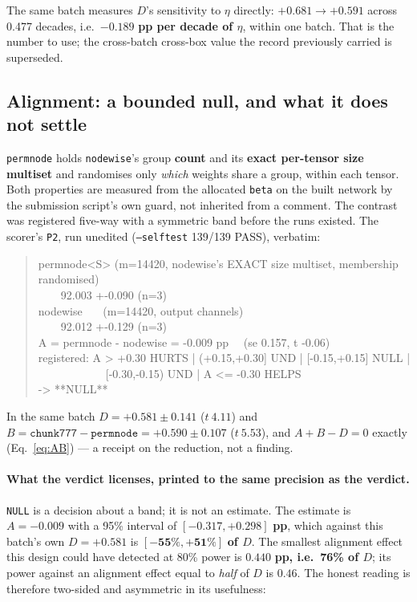 \documentclass[10pt,letterpaper]{article}
\newcommand{\Dstat}{D}                         %
\newcommand{\Astat}{A}                         %
\newcommand{\arm}[1]{\texttt{#1}}
\begin{document}
The same batch measures $\Dstat$'s sensitivity to $\eta$ directly: $+0.681 \rightarrow +0.591$
across 0.477 decades, i.e.\ $\mathbf{-0.189}$ \textbf{pp per decade of $\eta$}, within one batch.
That is the number to use; the cross-batch cross-box value the record previously carried is
superseded.

\subsection{Alignment: a bounded null, and what it does not settle}
\label{sec:alignment}

\arm{permnode} holds \arm{nodewise}'s group \textbf{count} and its \textbf{exact per-tensor size
multiset} and randomises only \emph{which} weights share a group, within each tensor. Both
properties are measured from the allocated \texttt{beta} on the built network by the submission
script's own guard, not inherited from a comment. The contrast was registered five-way with a
symmetric band before the runs existed. The scorer's \texttt{P2}, run unedited
(\texttt{--selftest} 139/139 PASS), verbatim:

\begin{quote}\ttfamily\footnotesize
permnode<S> (m=14420, nodewise's EXACT size multiset, membership randomised)\\
\ \ \ \ 92.003 +-0.090 (n=3)\\
nodewise \ \ \ (m=14420, output channels) \ \ \ \ \ \ \ \ \ \ \ \ \ \ \ \ \ \ \ \ \ \ \ \ \ \\
\ \ \ \ 92.012 +-0.129 (n=3)\\
A = permnode - nodewise = -0.009 pp \ \ (se 0.157, t -0.06)\\
registered: A > +0.30 HURTS | (+0.15,+0.30] UND | [-0.15,+0.15] NULL |\\
\ \ \ \ \ \ \ \ \ \ \ \ [-0.30,-0.15) UND | A <= -0.30 HELPS\\
-> **NULL**
\end{quote}

In the same batch $\Dstat = +0.581 \pm 0.141$ ($t\ 4.11$) and
$B = \arm{chunk777} - \arm{permnode} = +0.590 \pm 0.107$ ($t\ 5.53$), and
$\Astat + B - \Dstat = 0$ exactly (Eq.~\ref{eq:AB}) --- a receipt on the reduction, not a
finding.

\paragraph{What the verdict licenses, printed to the same precision as the verdict.}
\texttt{NULL} is a decision about a band; it is not an estimate. The estimate is
$\Astat = -0.009$ with a 95\% interval of $\mathbf{[-0.317, +0.298]}$ \textbf{pp}, which against
this batch's own $\Dstat = +0.581$ is $\mathbf{[-55\%, +51\%]}$ \textbf{of $\Dstat$}. The
smallest alignment effect this design could have detected at 80\% power is $\mathbf{0.440}$
\textbf{pp, i.e.\ 76\% of $\Dstat$}; its power against an alignment effect equal to \emph{half}
of $\Dstat$ is $\mathbf{0.46}$. The honest reading is therefore two-sided and asymmetric in its
usefulness:
\end{document}
